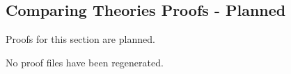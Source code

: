 \subsection*{Comparing Theories Proofs - Planned}

\begin{remark*}
Proofs for this section are planned.
\end{remark*}

\begin{remark*}
No proof files have been regenerated.
\end{remark*}
